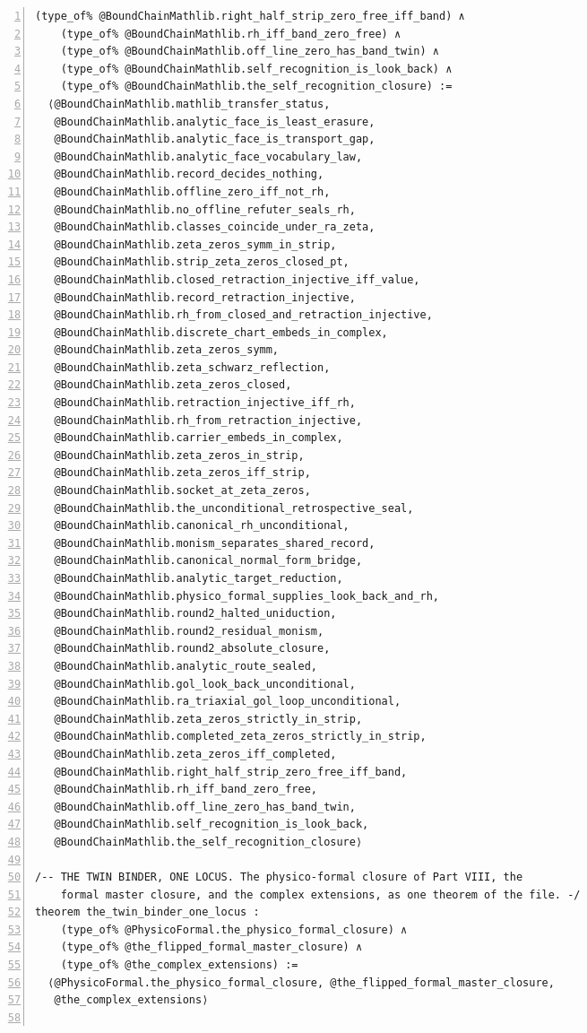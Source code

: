 \documentclass[10pt]{article}
\newcommand{\leansize}{\fontsize{5.5pt}{6.75pt}\selectfont}
\begin{document}
\begin{multicols}{2}
\begin{Verbatim}[numbers=left,firstnumber=1,numbersep=3pt,xleftmargin=2.6em,breaklines=true,breakanywhere=true,breakautoindent=false,breakindent=1.4em,breaksymbolleft={},breakanywheresymbolpre={},fontsize=\leansize]
    (type_of% @BoundChainMathlib.right_half_strip_zero_free_iff_band) ∧
    (type_of% @BoundChainMathlib.rh_iff_band_zero_free) ∧
    (type_of% @BoundChainMathlib.off_line_zero_has_band_twin) ∧
    (type_of% @BoundChainMathlib.self_recognition_is_look_back) ∧
    (type_of% @BoundChainMathlib.the_self_recognition_closure) :=
  ⟨@BoundChainMathlib.mathlib_transfer_status,
   @BoundChainMathlib.analytic_face_is_least_erasure,
   @BoundChainMathlib.analytic_face_is_transport_gap,
   @BoundChainMathlib.analytic_face_vocabulary_law,
   @BoundChainMathlib.record_decides_nothing,
   @BoundChainMathlib.offline_zero_iff_not_rh,
   @BoundChainMathlib.no_offline_refuter_seals_rh,
   @BoundChainMathlib.classes_coincide_under_ra_zeta,
   @BoundChainMathlib.zeta_zeros_symm_in_strip,
   @BoundChainMathlib.strip_zeta_zeros_closed_pt,
   @BoundChainMathlib.closed_retraction_injective_iff_value,
   @BoundChainMathlib.record_retraction_injective,
   @BoundChainMathlib.rh_from_closed_and_retraction_injective,
   @BoundChainMathlib.discrete_chart_embeds_in_complex,
   @BoundChainMathlib.zeta_zeros_symm,
   @BoundChainMathlib.zeta_schwarz_reflection,
   @BoundChainMathlib.zeta_zeros_closed,
   @BoundChainMathlib.retraction_injective_iff_rh,
   @BoundChainMathlib.rh_from_retraction_injective,
   @BoundChainMathlib.carrier_embeds_in_complex,
   @BoundChainMathlib.zeta_zeros_in_strip,
   @BoundChainMathlib.zeta_zeros_iff_strip,
   @BoundChainMathlib.socket_at_zeta_zeros,
   @BoundChainMathlib.the_unconditional_retrospective_seal,
   @BoundChainMathlib.canonical_rh_unconditional,
   @BoundChainMathlib.monism_separates_shared_record,
   @BoundChainMathlib.canonical_normal_form_bridge,
   @BoundChainMathlib.analytic_target_reduction,
   @BoundChainMathlib.physico_formal_supplies_look_back_and_rh,
   @BoundChainMathlib.round2_halted_uniduction,
   @BoundChainMathlib.round2_residual_monism,
   @BoundChainMathlib.round2_absolute_closure,
   @BoundChainMathlib.analytic_route_sealed,
   @BoundChainMathlib.gol_look_back_unconditional,
   @BoundChainMathlib.ra_triaxial_gol_loop_unconditional,
   @BoundChainMathlib.zeta_zeros_strictly_in_strip,
   @BoundChainMathlib.completed_zeta_zeros_strictly_in_strip,
   @BoundChainMathlib.zeta_zeros_iff_completed,
   @BoundChainMathlib.right_half_strip_zero_free_iff_band,
   @BoundChainMathlib.rh_iff_band_zero_free,
   @BoundChainMathlib.off_line_zero_has_band_twin,
   @BoundChainMathlib.self_recognition_is_look_back,
   @BoundChainMathlib.the_self_recognition_closure⟩

/-- THE TWIN BINDER, ONE LOCUS. The physico-formal closure of Part VIII, the
    formal master closure, and the complex extensions, as one theorem of the file. -/
theorem the_twin_binder_one_locus :
    (type_of% @PhysicoFormal.the_physico_formal_closure) ∧
    (type_of% @the_flipped_formal_master_closure) ∧
    (type_of% @the_complex_extensions) :=
  ⟨@PhysicoFormal.the_physico_formal_closure, @the_flipped_formal_master_closure,
   @the_complex_extensions⟩


\end{Verbatim}
\end{multicols}
\end{document}
